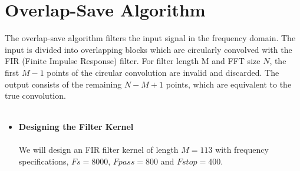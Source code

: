 \documentclass[12pt,a4paper]{article}
\begin{document}
\newpage
\section*{Overlap-Save Algorithm}
\large{The overlap-save algorithm filters the input signal in the frequency domain. The input is divided into overlapping blocks which are circularly convolved with the FIR (Finite Impulse Response) filter. For filter length M and FFT size $N$, the first $M-1$ points of the circular convolution are invalid and discarded. The output consists of the remaining $N-M+1$ points, which are equivalent to the true convolution.\\ \\}

\begin{itemize}
\item \textbf {Designing the Filter Kernel}{\\}{\\}
{We will design an FIR filter kernel of length $ M=113$ with frequency specifications, $Fs=8000$, $Fpass=800$ and $Fstop=400$.\\}


\end{itemize}
\end{document}
